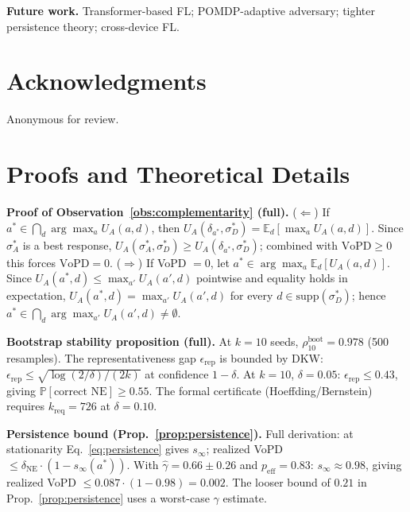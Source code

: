 \documentclass{article}
\newcommand{\UA}{U_A}
\begin{document}
\textbf{Future work.} Transformer-based FL; POMDP-adaptive adversary; tighter persistence theory; cross-device FL.

\section*{Acknowledgments}
Anonymous for review.




\newpage
\appendix

\section{Proofs and Theoretical Details}
\label{app:proofs}

\textbf{Proof of Observation~\ref{obs:complementarity} (full).} ($\Leftarrow$) If $a^* \in \bigcap_d \arg\max_a \UA(a,d)$, then $\UA(\delta_{a^*}, \sigma_D^*) = \mathbb{E}_d[\max_a \UA(a,d)]$. Since $\sigma_A^*$ is a best response, $\UA(\sigma_A^*, \sigma_D^*) \geq \UA(\delta_{a^*}, \sigma_D^*)$; combined with $\text{VoPD} \geq 0$ this forces $\text{VoPD} = 0$. ($\Rightarrow$) If VoPD $= 0$, let $a^* \in \arg\max_a \mathbb{E}_d[\UA(a,d)]$. Since $\UA(a^*,d) \leq \max_{a'}\UA(a',d)$ pointwise and equality holds in expectation, $\UA(a^*,d) = \max_{a'}\UA(a',d)$ for every $d \in \mathrm{supp}(\sigma_D^*)$; hence $a^* \in \bigcap_d \arg\max_{a'}\UA(a',d) \neq \emptyset$.

\textbf{Bootstrap stability proposition (full).} At $k=10$ seeds, $\rho_{10}^{\text{boot}} = 0.978$ (500 resamples). The representativeness gap $\epsilon_{\text{rep}}$ is bounded by DKW: $\epsilon_{\text{rep}} \leq \sqrt{\log(2/\delta)/(2k)}$ at confidence $1-\delta$. At $k=10$, $\delta=0.05$: $\epsilon_{\text{rep}} \leq 0.43$, giving $\mathbb{P}[\text{correct NE}] \geq 0.55$. The formal certificate (Hoeffding/Bernstein) requires $k_{\text{req}} = 726$ at $\delta=0.10$.

\textbf{Persistence bound (Prop.~\ref{prop:persistence}).} Full derivation: at stationarity Eq.~\ref{eq:persistence} gives $s_\infty$; realized VoPD $\leq \delta_{\text{NE}} \cdot (1 - s_\infty(a^*))$. With $\hat\gamma=0.66\pm0.26$ and $p_{\text{eff}}=0.83$: $s_\infty \approx 0.98$, giving realized VoPD $\leq 0.087 \cdot (1 - 0.98) = 0.002$. The looser bound of $0.21$ in Prop.~\ref{prop:persistence} uses a worst-case $\gamma$ estimate.
\end{document}
